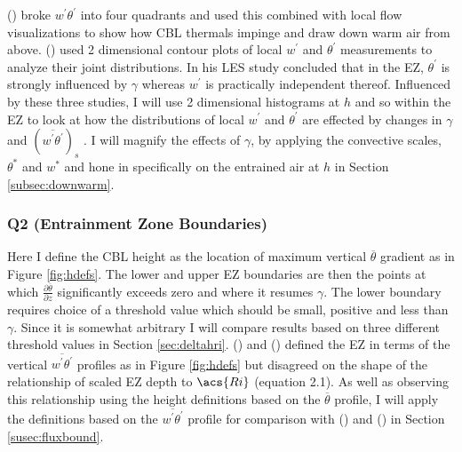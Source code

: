 \citeauthor{SullMoengStev} (\citeyear{SullMoengStev}) broke $w^{'}\theta^{'}$ into four quadrants and used this combined with local flow visualizations to show how \acs{CBL} thermals impinge and draw down warm air from above. \citeauthor{MahrtPaum} (\citeyear{MahrtPaum}) used 2 dimensional contour plots of local $w^{'}$ and $\theta^{'}$ measurements to analyze their joint distributions.  In his \citeyear{Sorbjan1} \acs{LES} study \citeauthor{Sorbjan1} concluded that in the \acs{EZ}, $\theta^{'}$ is strongly influenced by $\gamma$  whereas $w^{'}$ is practically independent thereof.  Influenced by these three studies, I will use 2 dimensional histograms at $h$ and so within the \acs{EZ} to look at how the distributions of local $w^{'}$ and $\theta^{'}$ are effected by changes in $\gamma$ and $(\overline{w^{'}\theta^{'}})_{s}$ .  I will magnify the effects of $\gamma$, by applying the convective scales, $\theta^{*}$ and $w^{*}$ and hone in specifically on the entrained air at $h$ in Section \ref{subsec:downwarm}.\\    

\subsubsection{Q2 (Entrainment Zone Boundaries)}
       
Here I define the \acs{CBL} height as the location of maximum vertical $\overline{\theta}$ gradient as in Figure \ref{fig:hdefs}.  The lower and upper \acs{EZ} boundaries are then the points at which $\frac{\partial \overline{\theta}}{\partial z}$ significantly exceeds zero and where it resumes $\gamma$.  The lower boundary requires choice of a threshold value which should be small, positive and less than $\gamma$. Since it is somewhat arbitrary I will compare results based on three different threshold values in Section \ref{sec:deltahri}.  \citeauthor{FedConzMir04} (\citeyear{FedConzMir04}) and \citeauthor{BrooksFowler2} (\citeyear{BrooksFowler2}) defined the \acs{EZ} in terms of the vertical $\overline{w^{'}\theta^{'}}$ profiles as in Figure \ref{fig:hdefs} but disagreed on the shape of the relationship of scaled \acs{EZ} depth to $\acs{Ri}$ (equation 2.1).  As well as observing this relationship using the height definitions based on the $\overline{\theta}$ profile, I will apply the definitions based on the $\overline{w^{'}\theta^{'}}$ profile for comparison with \citeauthor{BrooksFowler2} (\citeyear{BrooksFowler2}) and \citeauthor{FedConzMir04} (\citeyear{FedConzMir04}) in Section \ref{susec:fluxbound}.\\  

